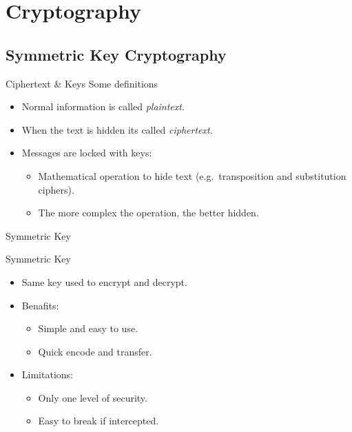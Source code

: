 \documentclass{beamer}
\begin{document}
\section{Cryptography}

\subsection{Symmetric Key Cryptography}

\begin{frame}{Ciphertext \& Keys}
Some definitions
	\begin{itemize}
		\pause \item Normal information is called \emph{plaintext}.
		\item When the text is hidden its called \emph{ciphertext}.
		\item Messages are locked with keys:  
		\begin{itemize}
			\item Mathematical operation to hide text (e.g.\ transposition and substitution ciphers).
			\item The more complex the operation, the better hidden.
		\end{itemize}
	\end{itemize}
\end{frame}

\begin{frame}{Symmetric Key}
	\begin{centering}
		\par
	\end{centering}
\end{frame}

\begin{frame}{Symmetric Key}
	\begin{itemize}
		\item Same key used to encrypt and decrypt.
		\item Benafits:
	 	\begin{itemize}
			\item Simple and easy to use.
			\item Quick encode and transfer.
		\end{itemize}
		\item Limitations:
		\begin{itemize}
			\item Only one level of security.
			\item Easy to break if intercepted.
		\end{itemize}
	\end{itemize}
\end{frame}
\end{document}
